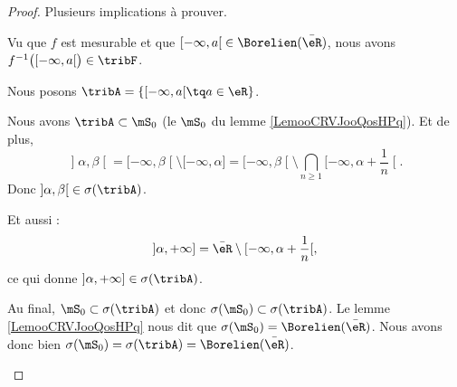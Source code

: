\begin{proof}
    Plusieurs implications à prouver.
    \begin{subproof}
        \item[\ref{ITEMooHAMHooYLqUhVi}\( \Rightarrow\)\ref{ITEMooHAMHooYLqUhVii}]
            Vu que \( f\) est mesurable et que \( \mathopen[ -\infty , a \mathclose[\in\Borelien(\bar\eR)\), nous avons \( f^{-1}\big( \mathopen[ -\infty , a \mathclose[ \big)\in\tribF\).
        \item[\ref{ITEMooHAMHooYLqUhVii}\( \Rightarrow\)\ref{ITEMooHAMHooYLqUhVi}]
            Nous posons \( \tribA=\{ \mathopen[ -\infty , a \mathclose[\tq a\in \eR \}\). 

                Nous avons \( \tribA\subset\mS_0\) (le \( \mS_0\) du lemme \ref{LemooCRVJooQosHPq}). Et de plus,
            \begin{equation}
            \mathopen] \alpha , \beta \mathclose[=\mathopen[ -\infty , \beta \mathclose[\setminus\mathopen[ -\infty , \alpha \mathclose]=\mathopen[ -\infty , \beta \mathclose[\setminus\bigcap_{n\geq 1}\mathopen[ -\infty , \alpha+\frac{1}{ n } \mathclose[.
            \end{equation}
        Donc \( \mathopen] \alpha , \beta \mathclose[\in\sigma(\tribA)\).

            Et aussi :
            \begin{equation}
                \mathopen] \alpha , +\infty \mathclose]=\bar\eR\setminus\mathopen[ -\infty , \alpha+\frac{1}{ n } \mathclose[,
            \end{equation}
        ce qui donne \( \mathopen] \alpha , +\infty \mathclose]\in \sigma(\tribA)\).

        Au final, \( \mS_0\subset\sigma(\tribA)\) et donc \( \sigma(\mS_0)\subset\sigma(\tribA)\). Le lemme \ref{LemooCRVJooQosHPq} nous dit que \( \sigma(\mS_0)=\Borelien(\bar \eR)\). Nous avons donc bien \( \sigma(\mS_0)=\sigma(\tribA)=\Borelien(\bar\eR)\).


\end{subproof}
\end{proof}

